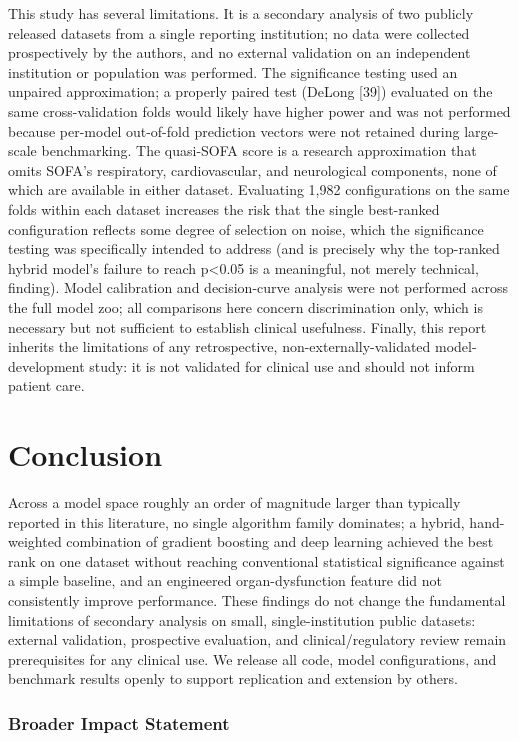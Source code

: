 \documentclass[10pt]{article} %
\begin{document}
This study has several limitations. It is a secondary analysis of two publicly released datasets from a single reporting institution; no data were collected prospectively by the authors, and no external validation on an independent institution or population was performed. The significance testing used an unpaired approximation; a properly paired test (DeLong [39]) evaluated on the same cross-validation folds would likely have higher power and was not performed because per-model out-of-fold prediction vectors were not retained during large-scale benchmarking. The quasi-SOFA score is a research approximation that omits SOFA's respiratory, cardiovascular, and neurological components, none of which are available in either dataset. Evaluating 1,982 configurations on the same folds within each dataset increases the risk that the single best-ranked configuration reflects some degree of selection on noise, which the significance testing was specifically intended to address (and is precisely why the top-ranked hybrid model's failure to reach p<0.05 is a meaningful, not merely technical, finding). Model calibration and decision-curve analysis were not performed across the full model zoo; all comparisons here concern discrimination only, which is necessary but not sufficient to establish clinical usefulness. Finally, this report inherits the limitations of any retrospective, non-externally-validated model-development study: it is not validated for clinical use and should not inform patient care.

\section{Conclusion}

Across a model space roughly an order of magnitude larger than typically reported in this literature, no single algorithm family dominates; a hybrid, hand-weighted combination of gradient boosting and deep learning achieved the best rank on one dataset without reaching conventional statistical significance against a simple baseline, and an engineered organ-dysfunction feature did not consistently improve performance. These findings do not change the fundamental limitations of secondary analysis on small, single-institution public datasets: external validation, prospective evaluation, and clinical/regulatory review remain prerequisites for any clinical use. We release all code, model configurations, and benchmark results openly to support replication and extension by others.

\subsubsection*{Broader Impact Statement}
\end{document}
